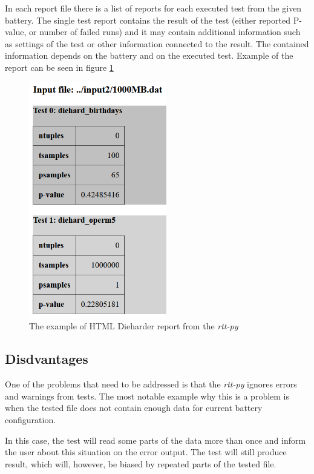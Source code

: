 \documentclass[
  digital,     %
  oneside,     %
  nosansbold,  %
  nocolorbold, %
  nolof,         %
  nolot,         %
]{fithesis4}
\begin{document}
In each report file there is a list of reports for each executed test from the given battery. The single test report contains the result of the test (either reported P-value, or number of failed runs) and it may contain additional information such as settings of the test or other information connected to the result. The contained information depends on the battery and on the executed test. Example of the  report can be seen in figure \ref{fig:rtt_py_html}
\begin{figure}
  \begin{center}
    \includegraphics[width=6cm]{figures/rtt-py-dieharder-html.png}
  \end{center}
  \caption{The example of HTML Dieharder report from the \emph{rtt-py}}
  \label{fig:rtt_py_html}
\end{figure}

\subsection{Disdvantages}
One of the problems that need to be addressed is that the \emph{rtt-py } ignores errors and warnings from tests. The most notable example why this is a problem is when the tested file does not contain enough data for current battery configuration.

In this case, the test will read some parts of the data more than once and inform the user about this situation on the error output. The test will still produce result, which will, however, be biased by repeated parts of the tested file.
\end{document}
